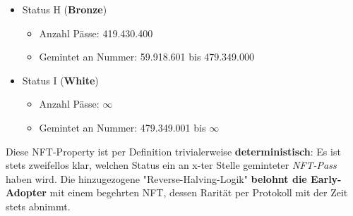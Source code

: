 \begin{NFT-Prop}
\begin{itemize}
\begin{itemize}
    	\item Gemintet an Nummer: 7.489.801 bis 59.918.600
    \end{itemize}
    \item Status H (\textbf{Bronze})
    \begin{itemize}
    	\item Anzahl Pässe: 419.430.400
    	\item Gemintet an Nummer: 59.918.601 bis 479.349.000
    \end{itemize}
    \item Status I (\textbf{White})
    \begin{itemize}
    	\item Anzahl Pässe: $\infty$
    	\item Gemintet an Nummer: 479.349.001 bis $\infty$
    \end{itemize}
\end{itemize}

\end{NFT-Prop}

\vspace{0.3cm}

Diese NFT-Property ist per Definition trivialerweise \textbf{deterministisch}: Es ist stets zweifellos klar, welchen Status ein an x-ter Stelle geminteter \textit{NFT-Pass} haben wird. Die hinzugezogene "Reverse-Halving-Logik" \textbf{belohnt die Early-Adopter} mit einem begehrten NFT, dessen Rarität per Protokoll mit der Zeit stets abnimmt.

\vspace{0.1cm}


